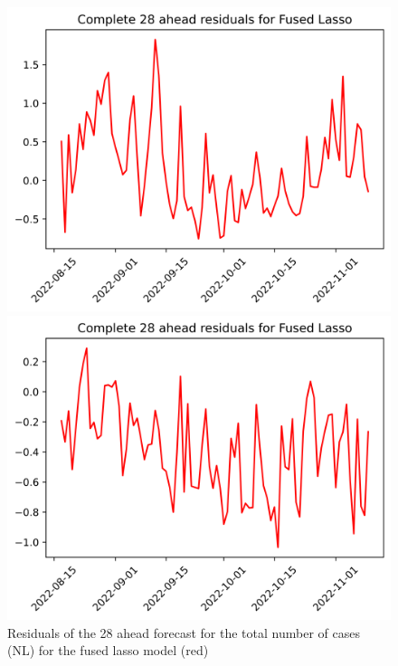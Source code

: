 \begin{figure}

\begin{minipage}{.32\textwidth}
  \centering
  \includegraphics[width=\linewidth]{pics/28_ah/28_ahead_errors_Fused Lasso.png}
  \caption{Residuals of the 28 ahead forecast for the total number of cases (NL) for the fused lasso model (red)}
  \label{fig:tot_cases_error_28_flasso}
\end{minipage}
\begin{minipage}{.32\textwidth}
  \centering
  \includegraphics[width=\linewidth]{pics/28_ah/DE_28_ahead_errors_Fused Lasso.png}

\end{minipage}
\end{figure}
